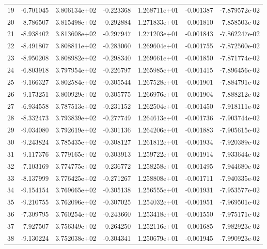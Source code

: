 \begin{tabular}{rrrrrrr}
  19 &  -6.701045 &  3.806134e+02 & -0.223368 &  1.268711e+01 &   -0.001387 & -7.879572e-02 \\
  20 &  -8.786507 &  3.815498e+02 & -0.292884 &  1.271833e+01 &   -0.001810 & -7.858503e-02 \\
  21 &  -8.938402 &  3.813608e+02 & -0.297947 &  1.271203e+01 &   -0.001843 & -7.862247e-02 \\
  22 &  -8.491807 &  3.808811e+02 & -0.283060 &  1.269604e+01 &   -0.001755 & -7.872560e-02 \\
  23 &  -8.950208 &  3.808982e+02 & -0.298340 &  1.269661e+01 &   -0.001850 & -7.871774e-02 \\
  24 &  -6.803918 &  3.797954e+02 & -0.226797 &  1.265985e+01 &   -0.001415 & -7.896456e-02 \\
  25 &  -9.166327 &  3.802584e+02 & -0.305544 &  1.267528e+01 &   -0.001901 & -7.884791e-02 \\
  26 &  -9.173251 &  3.800929e+02 & -0.305775 &  1.266976e+01 &   -0.001904 & -7.888212e-02 \\
  27 &  -6.934558 &  3.787513e+02 & -0.231152 &  1.262504e+01 &   -0.001450 & -7.918111e-02 \\
  28 &  -8.332473 &  3.793839e+02 & -0.277749 &  1.264613e+01 &   -0.001736 & -7.903744e-02 \\
  29 &  -9.034080 &  3.792619e+02 & -0.301136 &  1.264206e+01 &   -0.001883 & -7.905615e-02 \\
  30 &  -9.243824 &  3.785435e+02 & -0.308127 &  1.261812e+01 &   -0.001934 & -7.920389e-02 \\
  31 &  -9.117376 &  3.779165e+02 & -0.303913 &  1.259722e+01 &   -0.001914 & -7.933644e-02 \\
  32 &  -7.103169 &  3.774775e+02 & -0.236772 &  1.258258e+01 &   -0.001495 & -7.944680e-02 \\
  33 &  -8.137999 &  3.776425e+02 & -0.271267 &  1.258808e+01 &   -0.001711 & -7.940335e-02 \\
  34 &  -9.154154 &  3.769665e+02 & -0.305138 &  1.256555e+01 &   -0.001931 & -7.953577e-02 \\
  35 &  -9.210755 &  3.762096e+02 & -0.307025 &  1.254032e+01 &   -0.001951 & -7.969501e-02 \\
  36 &  -7.309795 &  3.760254e+02 & -0.243660 &  1.253418e+01 &   -0.001550 & -7.975171e-02 \\
  37 &  -7.927507 &  3.756349e+02 & -0.264250 &  1.252116e+01 &   -0.001685 & -7.982923e-02 \\
  38 &  -9.130224 &  3.752038e+02 & -0.304341 &  1.250679e+01 &   -0.001945 & -7.990923e-02 \\

\end{tabular}
